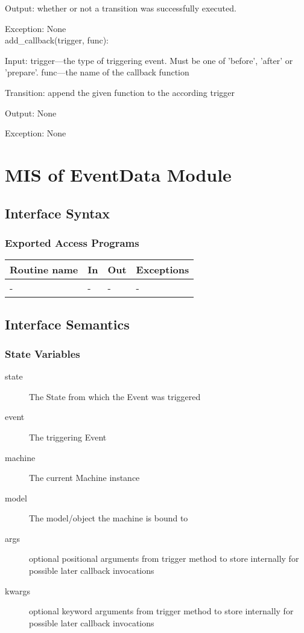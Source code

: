 \documentclass[12pt,titlepage]{article}
\begin{document}
Output: whether or not a transition was successfully executed.

Exception: None\\
add\_callback(trigger, func):

Input: trigger---the type of triggering event. Must be one of 'before', 'after'
or 'prepare'. func---the name of the callback function

Transition: append the given function to the according trigger

Output: None

Exception: None \\

\newpage
\section{MIS of EventData Module}

\subsection{Interface Syntax}
\subsubsection{Exported Access Programs}
\begin{tabular}{| l | l | l | p{6cm} |}
  \hline
  \textbf{Routine name} & \textbf{In} & \textbf{Out} & \textbf{Exceptions}\\
  \hline
  - & - & - & - \\
  \hline
\end{tabular}

\subsection{Interface Semantics}
\subsubsection{State Variables}
\begin{description}
\item[state] The State from which the Event was triggered
\item[event] The triggering Event
\item[machine] The current Machine instance
\item[model] The model/object the machine is bound to
\item[args] optional positional arguments from trigger method to store internally
  for possible later callback invocations
\item[kwargs] optional keyword arguments from trigger method to store internally
  for possible later callback invocations
\end{description}
\end{document}
